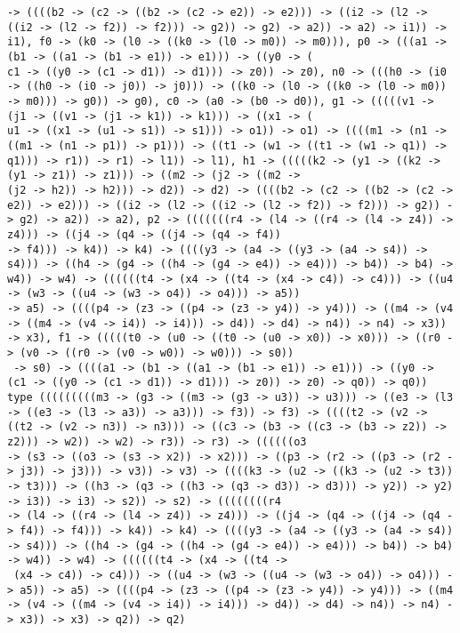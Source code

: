 \documentclass[11pt,oneside,a4paper]{report}
\begin{document}
\begin{lstlisting}[breaklines=true,caption={The output of an exponential type},label=lst:appedix:bigexp]
 -> ((((b2 -> (c2 -> ((b2 -> (c2 -> e2)) -> e2))) -> ((i2 -> (l2 -> ((i2 -> (l2 -> f2)) -> f2))) -> g2)) -> g2) -> a2)) -> a2) -> i1)) -> i1), f0 -> (k0 -> (l0 -> ((k0 -> (l0 -> m0)) -> m0))), p0 -> (((a1 -> (b1 -> ((a1 -> (b1 -> e1)) -> e1))) -> ((y0 -> (
c1 -> ((y0 -> (c1 -> d1)) -> d1))) -> z0)) -> z0), n0 -> (((h0 -> (i0 -> ((h0 -> (i0 -> j0)) -> j0))) -> ((k0 -> (l0 -> ((k0 -> (l0 -> m0)) -> m0))) -> g0)) -> g0), c0 -> (a0 -> (b0 -> d0)), g1 -> (((((v1 -> (j1 -> ((v1 -> (j1 -> k1)) -> k1))) -> ((x1 -> (
u1 -> ((x1 -> (u1 -> s1)) -> s1))) -> o1)) -> o1) -> ((((m1 -> (n1 -> ((m1 -> (n1 -> p1)) -> p1))) -> ((t1 -> (w1 -> ((t1 -> (w1 -> q1)) -> q1))) -> r1)) -> r1) -> l1)) -> l1), h1 -> (((((k2 -> (y1 -> ((k2 -> (y1 -> z1)) -> z1))) -> ((m2 -> (j2 -> ((m2 ->
(j2 -> h2)) -> h2))) -> d2)) -> d2) -> ((((b2 -> (c2 -> ((b2 -> (c2 -> e2)) -> e2))) -> ((i2 -> (l2 -> ((i2 -> (l2 -> f2)) -> f2))) -> g2)) -> g2) -> a2)) -> a2), p2 -> (((((((r4 -> (l4 -> ((r4 -> (l4 -> z4)) -> z4))) -> ((j4 -> (q4 -> ((j4 -> (q4 -> f4))
-> f4))) -> k4)) -> k4) -> ((((y3 -> (a4 -> ((y3 -> (a4 -> s4)) -> s4))) -> ((h4 -> (g4 -> ((h4 -> (g4 -> e4)) -> e4))) -> b4)) -> b4) -> w4)) -> w4) -> ((((((t4 -> (x4 -> ((t4 -> (x4 -> c4)) -> c4))) -> ((u4 -> (w3 -> ((u4 -> (w3 -> o4)) -> o4))) -> a5))
-> a5) -> ((((p4 -> (z3 -> ((p4 -> (z3 -> y4)) -> y4))) -> ((m4 -> (v4 -> ((m4 -> (v4 -> i4)) -> i4))) -> d4)) -> d4) -> n4)) -> n4) -> x3)) -> x3), f1 -> (((((t0 -> (u0 -> ((t0 -> (u0 -> x0)) -> x0))) -> ((r0 -> (v0 -> ((r0 -> (v0 -> w0)) -> w0))) -> s0))
 -> s0) -> ((((a1 -> (b1 -> ((a1 -> (b1 -> e1)) -> e1))) -> ((y0 -> (c1 -> ((y0 -> (c1 -> d1)) -> d1))) -> z0)) -> z0) -> q0)) -> q0))
type (((((((((m3 -> (g3 -> ((m3 -> (g3 -> u3)) -> u3))) -> ((e3 -> (l3 -> ((e3 -> (l3 -> a3)) -> a3))) -> f3)) -> f3) -> ((((t2 -> (v2 -> ((t2 -> (v2 -> n3)) -> n3))) -> ((c3 -> (b3 -> ((c3 -> (b3 -> z2)) -> z2))) -> w2)) -> w2) -> r3)) -> r3) -> ((((((o3
-> (s3 -> ((o3 -> (s3 -> x2)) -> x2))) -> ((p3 -> (r2 -> ((p3 -> (r2 -> j3)) -> j3))) -> v3)) -> v3) -> ((((k3 -> (u2 -> ((k3 -> (u2 -> t3)) -> t3))) -> ((h3 -> (q3 -> ((h3 -> (q3 -> d3)) -> d3))) -> y2)) -> y2) -> i3)) -> i3) -> s2)) -> s2) -> ((((((((r4
-> (l4 -> ((r4 -> (l4 -> z4)) -> z4))) -> ((j4 -> (q4 -> ((j4 -> (q4 -> f4)) -> f4))) -> k4)) -> k4) -> ((((y3 -> (a4 -> ((y3 -> (a4 -> s4)) -> s4))) -> ((h4 -> (g4 -> ((h4 -> (g4 -> e4)) -> e4))) -> b4)) -> b4) -> w4)) -> w4) -> ((((((t4 -> (x4 -> ((t4 ->
 (x4 -> c4)) -> c4))) -> ((u4 -> (w3 -> ((u4 -> (w3 -> o4)) -> o4))) -> a5)) -> a5) -> ((((p4 -> (z3 -> ((p4 -> (z3 -> y4)) -> y4))) -> ((m4 -> (v4 -> ((m4 -> (v4 -> i4)) -> i4))) -> d4)) -> d4) -> n4)) -> n4) -> x3)) -> x3) -> q2)) -> q2)

\end{lstlisting}
\end{document}
